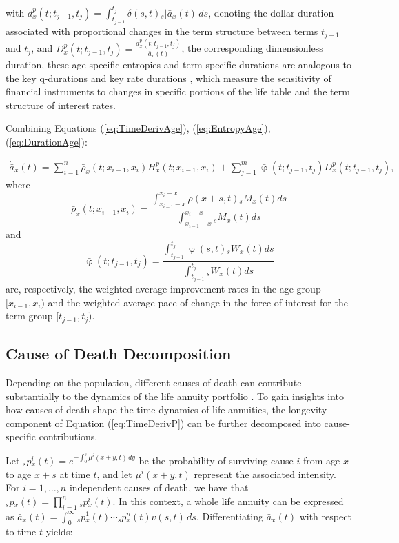 \documentclass[12pt]{article}
\begin{document}
{with ${d}^{p}_{x}(t;t_{j-1},t_{j}) = \int_{t_{j-1}}^{t_j} \delta(s,t) {}_s|\bar{a}_x(t) \, ds$, denoting the dollar duration associated with proportional changes in the term structure between terms $t_{j-1}$ and $t_{j}$, and ${D}^{p}_{x}(t;t_{j-1},t_{j}) = \frac{{d}^{p}_{x}(t;t_{j-1},t_{j})}{\bar{a}_x(t)}$, the corresponding dimensionless duration, these age-specific entropies and term-specific durations are analogous to the key q-durations \citep{li2012key} and key rate durations \citep{Ho1992}, which measure the sensitivity of financial instruments to changes in specific portions of the life table and the term structure of interest rates.



Combining Equations (\ref{eq:TimeDerivAge}), (\ref{eq:EntropyAge}), (\ref{eq:DurationAge}):  

\begin{equation}\label{eq:TimeDerivAge2}
\begin{split}
 \acute{\bar{a}}_x(t) = \sum_{i=1}^n\bar{\rho}_x(t;x_{i-1}, x_i){H}^{p}_x(t;x_{i-1}, x_i) +\sum_{j=1}^m\bar{\upvarphi}(t;t_{j-1},t_{j}){D}^{p}_x(t;t_{j-1},t_{j}),  
\end{split}
\end{equation}
where $$\bar{\rho}_x(t;x_{i-1}, x_i)= \frac{\int_{x_{i-1}-x}^{x_i-x} \rho(x+s,t) {}_sM_x(t)  ds}{\int_{x_{i-1}-x}^{x_i-x}  {}_sM_x(t)ds}$$ and 
$$\bar{\upvarphi}(t;t_{j-1},t_{j})= \frac{\int_{t_{j-1}}^{t_{j}} \upvarphi(s,t) {}_sW_x(t)  ds}{\int_{t_{j-1}}^{t_{j}} {}_sW_x(t) ds}$$ are, respectively, the weighted average improvement rates in the age group $[x_{i-1},x_{i})$ and the weighted average pace of change in the force of interest for the term group $[t_{j-1},t_{j})$. 





\subsection{Cause of Death Decomposition}


Depending on the population, different causes of death can contribute substantially to the dynamics of the life annuity portfolio \citep{lin2005securitization,kallestrup2020insight}. To gain insights into how causes of death shape the time dynamics of life annuities, the longevity component of Equation (\ref{eq:TimeDerivP}) can be further decomposed into cause-specific contributions.

Let ${_s}p{^i_x}(t) = e^{-\int_{0}^{s} \mu{^i}(x+y,t) \, dy}$ be the probability of surviving cause $i$ from age \(x\) to age \(x+s\) at time $t$, and let $\mu{^i}(x+y,t)$ represent the associated intensity. For $i = 1, \dots, n$ independent causes of death, we have that ${_s}p{_x}(t) = \prod_{i=1}^{n} {_s}p{^i_x}(t)$. In this context, a whole life annuity can be expressed as $\bar{a}_x(t) = \int_0^\infty {_s}p{^1_x}(t) \cdots {_s}p{^n_x}(t) {v}(s,t)\, ds.$ Differentiating $\bar{a}_x(t)$ with respect to time $t$ yields:


}
\end{document}

